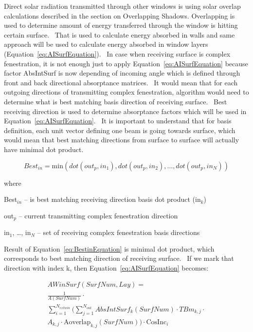 Direct solar radiation transmitted through other windows is using solar overlap calculations described in the section on Overlapping Shadows. Overlapping is used to determine amount of energy transferred through the window is hitting certain surface.~ That is used to calculate energy absorbed in walls and same approach will be used to calculate energy absorbed in window layers (Equation~\ref{eq:AISurfEquation}).~ In case when receiving surface is complex fenestration, it is not enough just to apply Equation~\ref{eq:AISurfEquation} because factor AbsIntSurf is now depending of incoming angle which is defined through front and back directional absorptance matrices.~ It would mean that for each outgoing directions of transmitting complex fenestration, algorithm would need to determine what is best matching basis direction of receiving surface.~ Best receiving direction is used to determine absorptance factors which will be used in Equation~\ref{eq:AISurfEquation}.~ It is important to understand that for basis definition, each unit vector defining one beam is going towards surface, which would mean that best matching directions from surface to surface will actually have minimal dot product.

\begin{equation}
Bes{t_{in}} = {\mathrm{min}}\left( {dot\left( {ou{t_p},i{n_1}} \right),dot\left( {ou{t_p},i{n_2}} \right), \ldots ,dot\left( {ou{t_p},i{n_N}} \right)} \right)
\label{eq:BestinEquation}
\end{equation}

where

Best\(_{in}\) -- is best matching receiving direction basis dot product (in\(_{k}\))

out\(_{p}\) -- current transmitting complex fenestration direction

in\(_{1}\), \ldots{}, in\(_{N}\) -- set of receiving complex fenestration basis directions

Result of Equation~\ref{eq:BestinEquation} is minimal dot product, which corresponds to best matching direction of receiving surface.~ If we mark that direction with index k, then Equation~\ref{eq:AISurfEquation} becomes:

\begin{equation}
  \begin{array}{l}
    AWinSurf(SurfNum,Lay) = \\
      \frac{1}{A(SurfNum)} \cdot \\
      \sum_{i = 1}^{N_{extwin}} (\sum\limits_{j = 1}^{N_{out}} AbsIntSur{f_k}(SurfNum) \cdot TB{m_{k,j}} \cdot \\
      A_{k,j} \cdot \text{Aoverlap}_{k,j}(SurfNum)) \cdot \text{CosInc}_i
  \end{array}
\end{equation}

